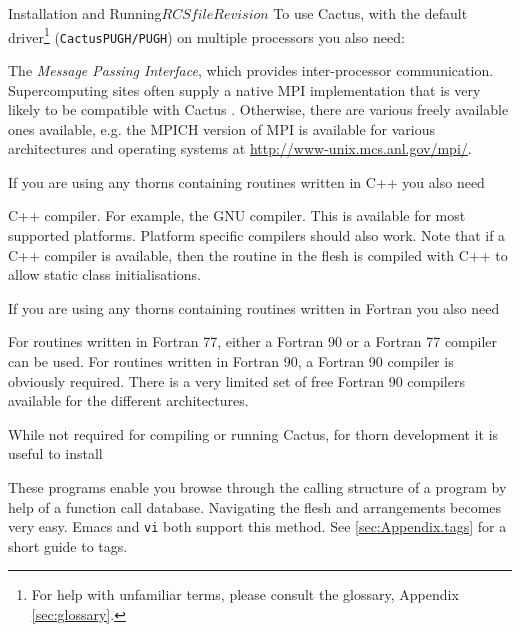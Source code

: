 \begin{cactuspart}{Installation and Running}{$RCSfile$}{$Revision$}
\noindent
To use Cactus, with the default driver\footnote{For help with unfamiliar terms, please consult the glossary, Appendix \ref{sec:glossary}.} (\texttt{CactusPUGH/PUGH}) on multiple
processors you also need:
\begin{Lentry}
\item[MPI] The \textit{Message Passing Interface},
which provides inter-processor communication.
Supercomputing sites often supply a native MPI implementation that is very likely to be compatible with Cactus . Otherwise, there are
various freely available ones available, e.g. the MPICH
version of MPI is available for various architectures and operating
systems at \url{http://www-unix.mcs.anl.gov/mpi/}.
\end{Lentry}

\noindent
If you are using any thorns containing routines
written in C++ you also need
\begin{Lentry}
\item[C++] C++ compiler. For example, the GNU compiler. This
 is available for most supported platforms.  Platform specific compilers
 should also work.  Note that if a C++ compiler is available, then the
  routine in the flesh is compiled with C++ to allow static
 class initialisations.
\end{Lentry}

\noindent
If you are using any thorns containing routines
written in Fortran you also need
\begin{Lentry}
\item[F90/F77] For routines written in Fortran 77, either a Fortran 90 or
 a Fortran 77 compiler can be used. For routines written in Fortran 90,
 a Fortran 90 compiler is obviously required. There is a very limited set of
 free Fortran 90 compilers available for the different architectures.
\end{Lentry}

\noindent
While not required for compiling or running Cactus, for thorn development
it is useful to install
\begin{Lentry}
\item[\texttt{ctags/etags}] These programs enable you browse through the
  calling structure of a program by help of a function call database.
  Navigating the flesh and arrangements becomes very easy. Emacs and
  \texttt{vi} both support this method. See \ref{sec:Appendix.tags} for a short
  guide to tags.
\end{Lentry}



\end{cactuspart}
